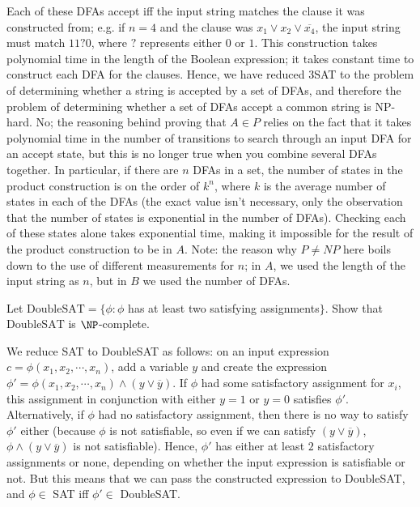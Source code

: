 \documentclass[solution, letterpaper]{cs121}
\begin{document}
\begin{solution}
Each of these DFAs accept iff the input string matches the clause it was constructed from; e.g. if $n = 4$ and the clause was $x_1 \vee x_2 \vee \overline{x_4}$, the input string must match $11?0$, where $?$ represents either $0$ or $1$.  This construction takes polynomial time in the length of the Boolean expression; it takes constant time to construct each DFA for the clauses.  Hence, we have reduced 3SAT to the problem of determining whether a string is accepted by a set of DFAs, and therefore the problem of determining whether a set of DFAs accept a common string is NP-hard.
\subsolution No; the reasoning behind proving that $A \in P$ relies on the fact that it takes polynomial time in the number of transitions to search through an input DFA for an accept state, but this is no longer true when you combine several DFAs together.  In particular, if there are $n$ DFAs in a set, the number of states in the product construction is on the order of $k^n$, where $k$ is the average number of states in each of the DFAs (the exact value isn't necessary, only the observation that the number of states is exponential in the number of DFAs).  Checking each of these states alone takes exponential time, making it impossible for the result of the product construction to be in $A$.  Note: the reason why $P \neq NP$ here boils down to the use of different measurements for $n$; in $A$, we used the length of the input string as $n$, but in $B$ we used the number of DFAs.
\end{solution}

Let $\text{DoubleSAT} = \{ \phi: \phi$ has at least two satisfying
assignments$\}$. Show that $\text{DoubleSAT}$ is $\NP$-complete.


\begin{solution}
We reduce SAT to DoubleSAT as follows: on an input expression $c = \phi(x_1,x_2,\cdots,x_n)$, add a variable $y$ and create the expression $\phi' = \phi(x_1,x_2,\cdots,x_n)\wedge (y \vee \overline{y})$.  If $\phi$ had some satisfactory assignment for $x_i$, this assignment in conjunction with either $y = 1$ or $y = 0$ satisfies $\phi'$.  Alternatively, if $\phi$ had no satisfactory assignment, then there is no way to satisfy $\phi'$ either (because $\phi$ is not satisfiable, so even if we can satisfy $(y \vee \overline{y})$, $\phi \wedge (y \vee \overline{y})$ is not satisfiable).  Hence, $\phi'$ has either at least $2$ satisfactory assignments or none, depending on whether the input expression is satisfiable or not.  But this means that we can pass the constructed expression to DoubleSAT, and $\phi \in$ SAT iff $\phi' \in$ DoubleSAT.
\end{solution}
        
\end{document}
